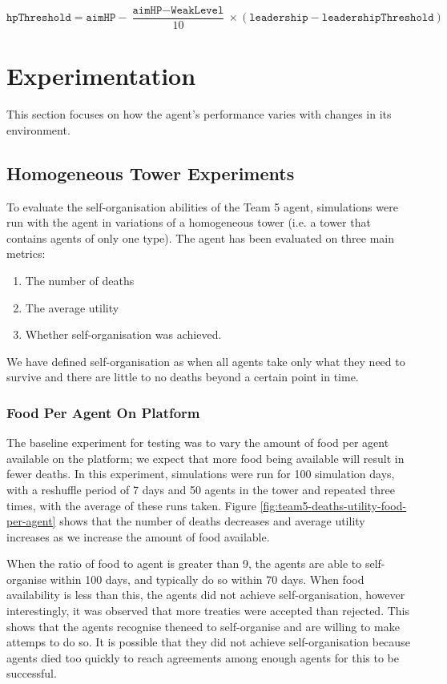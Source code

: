 \begin{equation}\label{eq:team5-treaty-hp-threshold}
    \texttt{hpThreshold} = \texttt{aimHP} - \frac{\texttt{aimHP} - \texttt{WeakLevel}}{10}\times\left(\texttt{leadership} - \texttt{leadershipThreshold}\right)
\end{equation}

\section{Experimentation}\label{sec:team5-experimentation}
This section focuses on how the agent's performance varies with changes in its environment.

\subsection*{Homogeneous Tower Experiments}
To evaluate the self-organisation abilities of the Team 5 agent, simulations were run with the agent in variations of a homogeneous tower (i.e. a tower that contains agents of only one type). The agent has been evaluated on three main metrics:
\begin{enumerate}
    \item The number of deaths
    \item The average utility
    \item Whether self-organisation was achieved.
\end{enumerate}
We have defined self-organisation as when all agents take only what they need to survive and there are little to no deaths beyond a certain point in time.

\subsubsection*{Food Per Agent On Platform}
The baseline experiment for testing was to vary the amount of food per agent available on the platform; we expect that more food being available will result in fewer deaths. In this experiment, simulations were run for 100 simulation days, with a reshuffle period of 7 days and 50 agents in the tower and repeated three times, with the average of these runs taken. Figure \ref{fig:team5-deaths-utility-food-per-agent} shows that the number of deaths decreases and average utility increases as we increase the amount of food available.

When the ratio of food to agent is greater than 9, the agents are able to self-organise within 100 days, and typically do so within 70 days. When food availability is less than this, the agents did not achieve self-organisation, however interestingly, it was observed that more treaties were accepted than rejected. This shows that the agents recognise theneed to self-organise and are willing to make attemps to do so. It is possible that they did not achieve self-organisation because agents died too quickly to reach agreements among enough agents for this to be successful.

